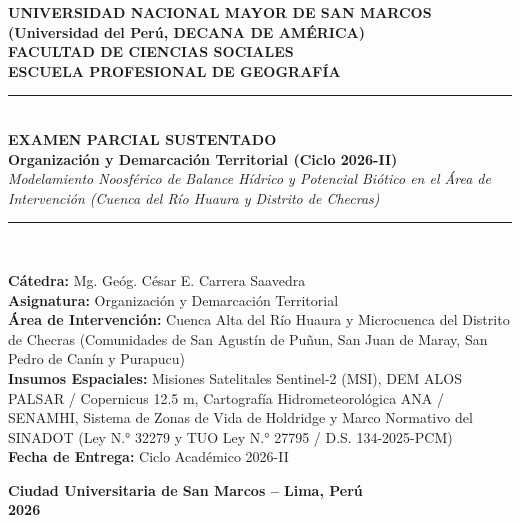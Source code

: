 \documentclass[11pt,a4paper]{article}
\begin{document}
\begin{titlepage}
    \centering
    \vspace*{0.5cm}
    {\Large\textbf{UNIVERSIDAD NACIONAL MAYOR DE SAN MARCOS}}\\[0.2cm]
    {\large\textbf{(Universidad del Perú, DECANA DE AMÉRICA)}}\\[0.3cm]
    {\large\textbf{FACULTAD DE CIENCIAS SOCIALES}}\\[0.2cm]
    {\large\textbf{ESCUELA PROFESIONAL DE GEOGRAFÍA}}\\[1.2cm]
    
    \rule{\linewidth}{1.5pt}\\[0.4cm]
    {\huge\bfseries EXAMEN PARCIAL SUSTENTADO}\\[0.3cm]
    {\Large\bfseries Organización y Demarcación Territorial (Ciclo 2026-II)}\\[0.3cm]
    {\large\textit{Modelamiento Noosférico de Balance Hídrico y Potencial Biótico en el Área de Intervención (Cuenca del Río Huaura y Distrito de Checras)}}\\[0.2cm]
    \rule{\linewidth}{1.5pt}\\[1.2cm]
    
    \begin{minipage}{0.85\textwidth}
        \textbf{Cátedra:} Mg. Geóg. César E. Carrera Saavedra\\
        \textbf{Asignatura:} Organización y Demarcación Territorial\\
        \textbf{Área de Intervención:} Cuenca Alta del Río Huaura y Microcuenca del Distrito de Checras (Comunidades de San Agustín de Puñun, San Juan de Maray, San Pedro de Canín y Purapucu)\\
        \textbf{Insumos Espaciales:} Misiones Satelitales Sentinel-2 (MSI), DEM ALOS PALSAR / Copernicus 12.5 m, Cartografía Hidrometeorológica ANA / SENAMHI, Sistema de Zonas de Vida de Holdridge y Marco Normativo del SINADOT (Ley N.° 32279 y TUO Ley N.° 27795 / D.S. 134-2025-PCM)\\
        \textbf{Fecha de Entrega:} Ciclo Académico 2026-II
    \end{minipage}
    
    \vfill
    {\small\textbf{Ciudad Universitaria de San Marcos -- Lima, Perú}}\\
    {\small\textbf{2026}}
\end{titlepage}
\end{document}
